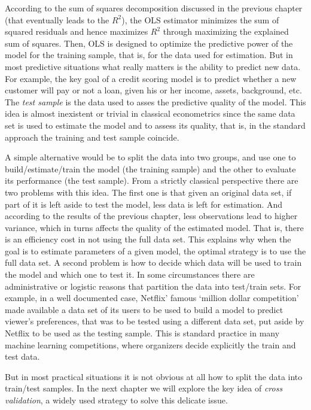 According to the sum of squares decomposition discussed in the previous chapter (that eventually leads to the $R^2$), the OLS estimator minimizes the sum of squared residuals and hence maximizes $R^2$ through maximizing the explained sum of squares. Then, OLS is designed to optimize the predictive power of the model for the training sample, that is, for the data used for estimation. But in most predictive situations what really matters is the ability to predict new data. For example, the key goal of a credit scoring model is to predict whether a new customer will pay or not a loan, given his or her income, assets, background, etc. 
The \emph{test sample} is the data used to asses the predictive quality of the model. This idea is almost inexistent or trivial in classical econometrics since the same data set is used to estimate the model and to assess its quality, that is, in the standard approach the training and test sample coincide. 

A simple alternative would be to split the data into two groups, and use one to build/estimate/train the model (the training sample) and the other to evaluate its performance (the test sample). From a strictly classical perspective there are two problems with this idea. The first one is that given an original data set, if part of it is left aside to test the model, less data is left for estimation. And according to the results of the previous chapter, less observations lead to higher variance, which in turns affects the quality of the estimated model. That is, there is an efficiency cost in not using the full data set. This explains why when the goal is to estimate parameters of a given model, the optimal strategy is to use the full data set. A second problem is how to decide which data will be used to train the model and which one to test it. In some circumstances there are administrative or logistic reasons that partition the data into test/train sets. For example, in a well documented case, Netflix' famous `million dollar competition' made available a data set of its users to be used to build a model to predict viewer's preferences, that was to be tested using a different data set, put aside by Netflix to be used as the testing sample. This is standard practice in many machine learning competitions, where organizers decide explicitly the train and test data. 

But in most practical situations it is not obvious at all how to split the data into train/test samples. In the next chapter we will explore the key idea of \emph{cross validation}, a widely used strategy to solve this delicate issue. 

